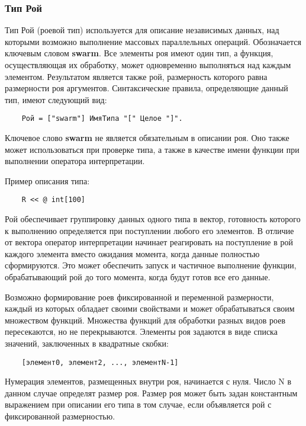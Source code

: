 {\subsubsection{Тип Рой}

Тип Рой (роевой тип) используется для описание независимых данных, над которыми возможно выполнение массовых параллельных операций. Обозначается ключевым словом \textbf{swarm}. Все элементы роя имеют один тип, а функция, осуществляющая их обработку, может одновременно выполняться над каждым элементом. Результатом является также рой, размерность которого равна размерности роя аргументов. Синтаксические правила, определяющие данный тип, имеют следующий вид:

\begin{verbatim}
    Рой = ["swarm"] ИмяТипа "[" Целое "]".
\end{verbatim}

Ключевое слово \textbf{swarm} не является обязательным в описании роя. Оно также может использоваться при проверке типа, а также в качестве имени функции при выполнении оператора интерпретации.

Пример описания типа:

\begin{verbatim}
    R << @ int[100]
\end{verbatim}


Рой обеспечивает группировку данных одного типа в вектор, готовность которого к выполнению определяется при поступлении любого его элементов. В отличие от вектора оператор интерпретации начинает реагировать на поступление в рой каждого элемента вместо ожидания момента, когда данные полностью сформируются. Это может обеспечить запуск и частичное выполнение функции, обрабатывающий рой до того момента, когда будут готов все его данные.

Возможно формирование роев фиксированной и переменной размерности, каждый из которых обладает своими свойствами и может обрабатываться своим множеством функций. Множества функций для обработки разных видов роев пересекаются, но не перекрываются. Элементы роя задаются в виде списка значений, заключенных в квадратные скобки:

\begin{verbatim}
    [элемент0, элемент2, ..., элементN-1]
\end{verbatim}

Нумерация элементов, размещенных внутри роя, начинается с нуля. Число N в данном случае определят размер роя. Размер роя может быть задан константным выражением при описании его типа в том случае, если объявляется рой с фиксированной размерностью.

}
